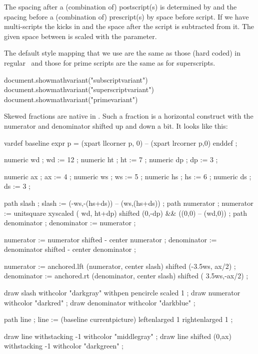 The spacing after a (combination of) postscript(s) is determined by  and the spacing before a (combination of) prescript(s) by \quote
{space before script}. If we have multi-scripts the 
kicks in and the space after the script is subtracted from it. The given space
between is scaled with the \type {\scriptspacebetweenfactor} parameter.

The default style mapping that we use are the same as those (hard coded) in
regular \TEX\ and those for prime scripts are the same as for superscripts.

\startluacode
document.showmathvariant("subscriptvariant")
document.showmathvariant("superscriptvariant")
document.showmathvariant("primevariant")
\stopluacode

\stopsection

\startsection[title=Skewed fractions]

Skewed fractions are native in \LUAMETATEX. Such a fraction is a horizontal
construct with the numerator and denominator shifted up and down a bit. It looks
like this:

\startlinecorrection
\startMPcode
    vardef baseline expr p =
        (xpart llcorner p, 0) -- (xpart lrcorner p,0)
    enddef ;

    numeric wd ; wd := 12 ;
    numeric ht ; ht :=  7 ;
    numeric dp ; dp :=  3 ;

    numeric ax ; ax :=  4 ;
    numeric ws ; ws :=  5 ;
    numeric hs ; hs :=  6 ;
    numeric ds ; ds :=  3 ;

    path slash       ; slash       := (-ws,-(hs+ds)) -- (ws,(hs+ds))  ;
    path numerator   ; numerator   := unitsquare xyscaled ( wd, ht+dp) shifted (0,-dp) && ((0,0) -- (wd,0)) ;
    path denominator ; denominator := numerator ;

    numerator   := numerator   shifted - center numerator ;
    denominator := denominator shifted - center denominator ;

    numerator   := anchored.lft (numerator,   center slash) shifted (-3.5ws, ax/2) ;
    denominator := anchored.rt  (denominator, center slash) shifted ( 3.5ws,-ax/2) ;

    draw slash       withcolor "darkgray" withpen pencircle scaled 1 ;
    draw numerator   withcolor "darkred"  ;
    draw denominator withcolor "darkblue" ;

    path line ; line := (baseline currentpicture) leftenlarged 1 rightenlarged 1 ;

    draw line                withstacking -1 withcolor "middlegray" ;
    draw line shifted (0,ax) withstacking -1 withcolor "darkgreen"  ; %

